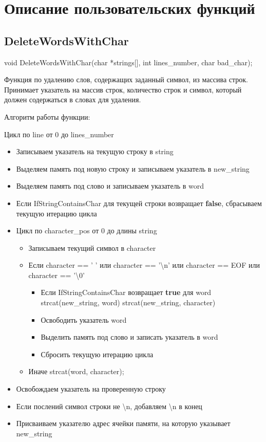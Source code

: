\documentclass[12pt,a4paper]{article}  %
\begin{document}
	\section*{Описание пользовательских функций}
	
	\subsection*{DeleteWordsWithChar}
	void DeleteWordsWithChar(char *strings[], int lines\_number, char bad\_char);
	
	Функция по удалению слов, содержащих заданный символ, из массива строк. Принимает указатель на массив строк, количество строк и символ, который должен содержаться в словах для удаления.
	
	Алгоритм работы функции:
	
	Цикл по line от 0 до lines\_number
		\begin{itemize}
			\item Записываем указатель на текущую строку в string
			\item Выделяем память под новую строку и записываем указатель в new\_string
			\item Выделяем память под слово и записываем указатель в word
			\item Если IfStringContainsChar для текущей строки возвращает \textbf{false}, сбрасываем текущую итерацию цикла
			\item Цикл по character\_pos от 0 до длины string
			\begin{itemize}
				\item Записываем текущий символ в character
				\item Если character == ' ' или character == '\textbackslash n' или character == EOF или character == '\textbackslash 0'
				\begin{itemize}
					\item Если IfStringContainsChar возвращает \textbf{true} для word
					\subitem strcat(new\_string, word)
					\subitem strcat(new\_string, character)
					\item Освободить указатель word
					\item Выделить память под слово и записать указатель в word
					\item Сбросить текущую итерацию цикла
				\end{itemize}
				\item Иначе
				\subitem strcat(word, character);
			\end{itemize}
		\item Освобождаем указатель на проверенную строку
		\item Если послений символ строки не \textbackslash n, добавляем \textbackslash n в конец
		\item Присваиваем указателю адрес ячейки памяти, на которую указывает new\_string
		\end{itemize}
	
\end{document}

